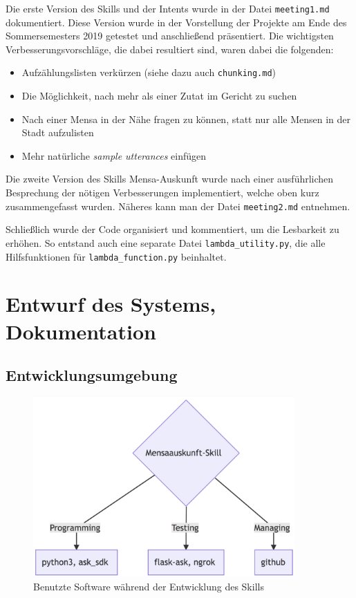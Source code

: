 \documentclass[12pt]{article}
\begin{document}
Die erste Version des Skills und der Intents wurde in der Datei \texttt{meeting1.md} dokumentiert.
Diese Version wurde in der Vorstellung der Projekte am Ende des Sommersemesters 2019 getestet und anschließend präsentiert.
Die wichtigsten Verbesserungsvorschläge, die dabei resultiert sind, waren dabei die folgenden:
\begin{itemize}
	\setlength\itemsep{0em}
	\item Aufzählungslisten verkürzen (siehe dazu auch  \texttt{chunking.md})
	\item Die Möglichkeit, nach mehr als einer Zutat im Gericht zu suchen
	\item Nach einer Mensa in der Nähe fragen zu können, statt nur alle Mensen in der Stadt aufzulisten
	\item Mehr natürliche \emph{sample utterances} einfügen
\end{itemize}

Die zweite Version des Skills Mensa-Auskunft wurde nach einer ausführlichen Besprechung der nötigen Verbesserungen implementiert, welche oben kurz zusammengefasst wurden. 
Näheres kann man der Datei \texttt{meeting2.md} entnehmen. 

Schließlich wurde der Code organisiert und kommentiert, um die Lesbarkeit zu erhöhen. 
So entstand auch eine separate Datei \texttt{lambda\_utility.py}, die alle Hilfsfunktionen für \texttt{lambda\_function.py} beinhaltet. 

\section{Entwurf des Systems, Dokumentation}
\subsection{Entwicklungsumgebung}
\begin{figure}[h]
\center
\includegraphics[width=10cm]{mermaid-diagram.png}
\caption{Benutzte Software während der Entwicklung des Skills}
\end{figure}
\end{document}
